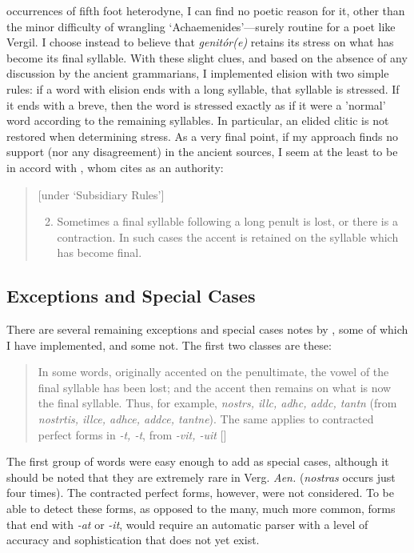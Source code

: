 \documentclass[11pt,a4paper]{scrartcl} %
\newcommand{\ictmacron}[1]{\twoacc[\'|\={#1}]}
\begin{document}
{occurrences of fifth foot heterodyne, I can find no poetic reason for it, other than the minor difficulty of wrangling `Achaemenides'---surely routine for a poet like Vergil. I choose instead to believe that \textit{genit\'or(e)} retains its stress on what has become its final syllable. With these slight clues, and based on the absence of any discussion by the ancient grammarians, I implemented elision with two simple rules: if a word with elision ends with a long syllable, that syllable is stressed. If it ends with a breve, then the word is stressed exactly as if it were a 'normal' word according to the remaining syllables. In particular, an elided clitic is not restored when determining stress. As a very final point, if my approach finds no support (nor any disagreement) in the ancient sources, I seem at the least to be in accord with \cite[68]{westaway}, whom \cite[186 n. 1]{knight1931homodyne} cites as an authority:
\begin{quote}
[under `Subsidiary Rules']
\begin{enumerate}[(1)]\setcounter{enumi}{1}
    \item Sometimes a final syllable following a long penult is lost, or there is a contraction. In such cases the accent is retained on the syllable which has become final.
\end{enumerate}
\end{quote}

\subsection{Exceptions and Special Cases}

There are several remaining exceptions and special cases notes by \cite[87]{sidney1965vox}, some of which I have implemented, and some not. The first two classes are these:
\begin{quote}
In some words, originally accented on the penultimate, the vowel of the final syllable has been lost; and the accent then remains on what is now the final syllable. Thus, for example, \textit{nostr\ictmacron{a}s, ill\ictmacron{\i}c, adh\ictmacron{u}c, add\ictmacron{u}c, tant\ictmacron{o}n} (from \textit{nostr\ictmacron{a}tis, ill\ictmacron{\i}ce, adh\ictmacron{u}ce, add\ictmacron{u}ce, tant\ictmacron{o}ne}). The same applies to contracted perfect forms in \textit{-\ictmacron{a}t, -\ictmacron{\i}t}, from \textit{-\ictmacron{a}vit, -\ictmacron{\i}uit} [\textellipsis]
\end{quote}
The first group of words were easy enough to add as special cases, although it should be noted that they are extremely rare in Verg. \textit{Aen.} (\textit{nostras} occurs just four times). The contracted perfect forms, however, were not considered. To be able to detect these forms, as opposed to the many, much more common, forms that end with \textit{-at} or \textit{-it}, would require an automatic parser with a level of accuracy and sophistication that does not yet exist.\\

}
\end{document}
